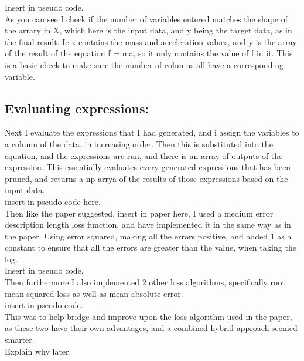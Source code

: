 \documentclass{article}
\begin{document}
Insert in pseudo code.\\

As you can see I check if the number of variables entered matches the shape of the arrary in X, which here is the input data, and y being the target data, as in the final result. Ie x contains the mass and acceleration values, and y is the array of the result of the equation f = ma, so it only contains the value of f in it. This is a basic check to make sure the number of columns all have a corresponding variable.\\ 

\subsection{ Evaluating expressions: }

Next I evaluate the expressions that I had generated, and i assign the variables to a column of the data, in increasing order. Then this is substituted into the equation, and the expressions are run, and there is an array of outputs of the expression. This essentially evaluates every generated expressions that has been pruned, and returns a np arrya of the results of those expressions based on the input data.\\ 

insert in pseudo code here.\\

Then like the paper suggested, insert in paper here, I used a medium error description length loss function, and have implemented it in the same way as in the paper. Using error squared, making all the errors positive, and added 1 as a constant to ensure that all the errors are greater than the value, when taking the log. \\

Insert in pseudo code. \\

Then furthermore I also implemented 2 other loss algorithms, specifically root mean squared loss as well as mean absolute error.\\

insert in pseudo code.\\

This was to help bridge and improve upon the loss algorithm used in the paper, as these two have their own advantages, and a combined hybrid approach seemed smarter.\\ 
Explain why later.\\
\end{document}
